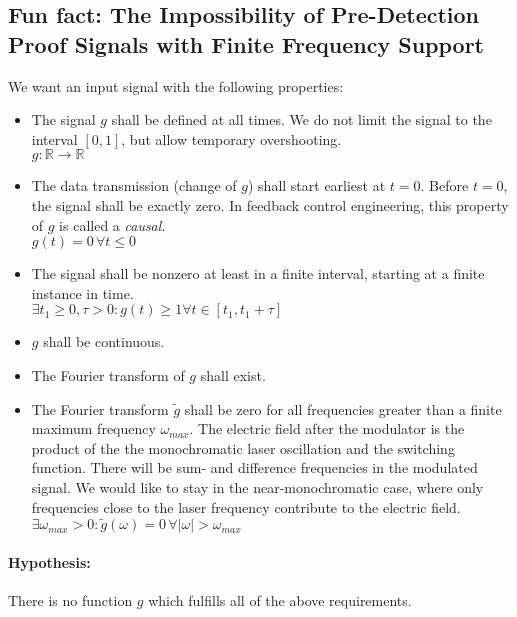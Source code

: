 \documentclass[12pt,a4paper,twoside,openright,BCOR10mm,headsepline,titlepage,abstracton,chapterprefix,final]{scrreprt}
\begin{document}
\subsection{Fun fact: The Impossibility of Pre-Detection Proof Signals with Finite Frequency Support}
We want an input signal with the following properties:
\begin{itemize}
 \item The signal $g$ shall be defined at all times.
       We do not limit the signal to the interval $[0,1]$, but allow temporary overshooting.\\
       $g:\mathbb{R}\rightarrow \mathbb{R}$
 \item The data transmission (change of $g$) shall start earliest at $t=0$.
       Before $t=0$, the signal shall be exactly zero.
       In feedback control engineering, this property of $g$ is called a \emph{causal}.\\
       $g(t)=0 \,\forall t\leq0$
 \item The signal shall be nonzero at least in a finite interval, 
       starting at a finite instance in time.\\
       $\exists t_1\geq0, \tau>0: g(t) \geq 1 \forall t \in [t_1, t_1+\tau]$
 \item $g$ shall be continuous.
 \item The Fourier transform of $g$ shall exist.
 \item The Fourier transform $\tilde{g}$ shall be zero 
       for all frequencies greater than a finite maximum frequency $\omega_{max}$.
       The electric field after the modulator is 
       the product of the the monochromatic laser oscillation and the switching function.
       There will be sum- and difference frequencies in the modulated signal.
       We would like to stay in the near-monochromatic case, 
       where only frequencies close to the laser frequency contribute to the electric field.\\
       $\exists \omega_{max}>0 : \tilde{g}(\omega) = 0 \,\forall |\omega| > \omega_{max}$
\end{itemize}

\paragraph{Hypothesis:} There is no function $g$ which fulfills all of the above requirements.
\end{document}
